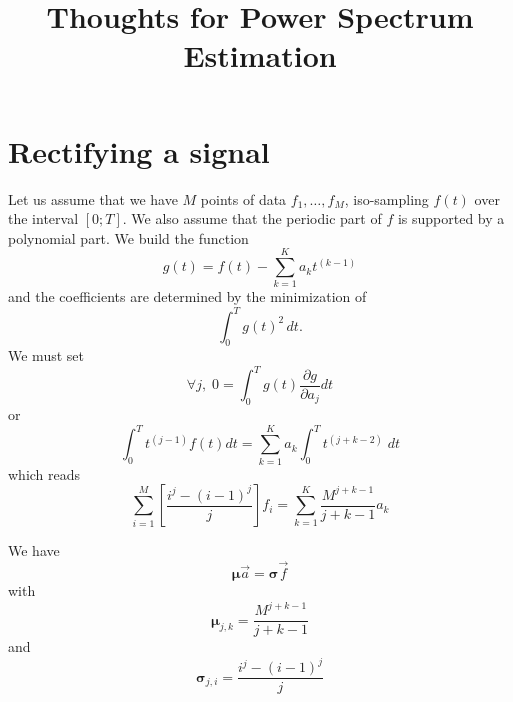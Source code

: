 \documentclass[aps,twocolumn]{revtex4}
\newcommand{\mymat}[1]{\boldsymbol{#1}}
\begin{document}
\title{Thoughts for Power Spectrum Estimation}
\maketitle


\section{Rectifying a signal}
Let us assume that we have $M$ points of data $f_1,\ldots,f_M$, iso-sampling $f(t)$ over the interval $[0;T]$.
We also assume that the periodic part of $f$ is supported by a polynomial part.
We build the function
\begin{equation}
	g(t) = f(t) - \sum_{k=1}^K a_k t^{(k-1)}
\end{equation}
and the coefficients are determined by the minimization of
\begin{equation}
\int_0^T g(t)^2\,dt.
\end{equation}
We must set
\begin{equation}
	\forall j,\; 0 = \int_0^T g(t)\dfrac{\partial g}{\partial a_j} dt
\end{equation}
or
\begin{equation}
	\int_0^T t^{(j-1)} f(t) dt = \sum_{k=1}^K a_k \int_{0}^T t^{(j+k-2)} \; dt 
\end{equation}
which reads
\begin{equation}
	\sum_{i=1}^M 
	\left\lbrack 
	\dfrac{i^j - (i-1)^{j}}{j}	\right\rbrack
 f_i = \sum_{k=1}^K \dfrac{M^{j+k-1}}{j+k-1} a_k
\end{equation}

We have
\begin{equation}
\mymat{\mu} \vec{a} = \mymat{\sigma}\vec{f}
\end{equation}
with
\begin{equation}
	\mymat{\mu}_{j,k} = \dfrac{M^{j+k-1}}{j+k-1}
\end{equation}
and
\begin{equation}
	\mymat{\sigma}_{j,i} = \dfrac{i^j - (i-1)^{j}}{j}
\end{equation}
\end{document}
